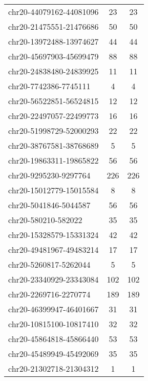 \begin{longtable}{lSS}
	chr20-44079162-44081096 & 23     & 23                         \\
	chr20-21475551-21476686 & 50     & 50                         \\
	chr20-13972488-13974627 & 44     & 44                         \\
	chr20-45697903-45699479 & 88     & 88                         \\
	chr20-24838480-24839925 & 11     & 11                         \\
	chr20-7742386-7745111   & 4      & 4                          \\
	chr20-56522851-56524815 & 12     & 12                         \\
	chr20-22497057-22499773 & 16     & 16                         \\
	chr20-51998729-52000293 & 22     & 22                         \\
	chr20-38767581-38768689 & 5      & 5                          \\
	chr20-19863311-19865822 & 56     & 56                         \\
	chr20-9295230-9297764   & 226    & 226                        \\
	chr20-15012779-15015584 & 8      & 8                          \\
	chr20-5041846-5044587   & 56     & 56                         \\
	chr20-580210-582022     & 35     & 35                         \\
	chr20-15328579-15331324 & 42     & 42                         \\
	chr20-49481967-49483214 & 17     & 17                         \\
	chr20-5260817-5262044   & 5      & 5                          \\
	chr20-23340929-23343084 & 102    & 102                        \\
	chr20-2269716-2270774   & 189    & 189                        \\
	chr20-46399947-46401667 & 31     & 31                         \\
	chr20-10815100-10817410 & 32     & 32                         \\
	chr20-45864818-45866440 & 53     & 53                         \\
	chr20-45489949-45492069 & 35     & 35                         \\
	chr20-21302718-21304312 & 1      & 1                          \\

\end{longtable}
